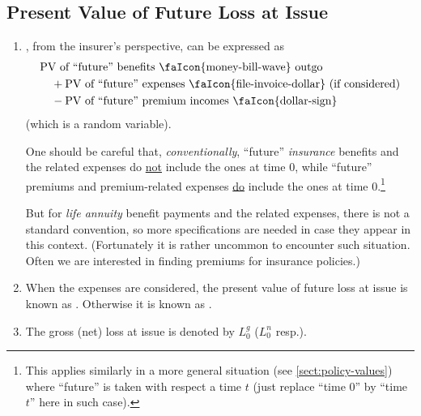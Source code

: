 \subsection{Present Value of Future Loss at Issue}
\begin{enumerate}
\item \label{it:pv-future-loss-at-issue}
, from the insurer's 
perspective, can be expressed as
\begin{align*}
&\text{PV of ``future'' benefits \faIcon{money-bill-wave} outgo} \\
&\quad+ \text{PV of ``future'' expenses \faIcon{file-invoice-dollar} (if considered)}\\
&\quad- \text{PV of ``future'' premium incomes \faIcon{dollar-sign}}
\end{align*}
(which is a random variable).

\begin{warning}
One should be careful that, \emph{conventionally}, ``future'' \emph{insurance}
benefits and the related expenses do \underline{not} include the ones at time
0, while ``future'' premiums and premium-related expenses \underline{do}
include the ones at time 0.\footnote{This applies similarly in a more general
situation (see \cref{sect:policy-values}) where ``future'' is taken with
respect a time \(t\) (just replace ``time 0'' by ``time \(t\)'' here in such
case).}

But for \emph{life annuity} benefit payments and the related expenses,
there is not a standard convention, so more specifications are needed in case
they appear in this context.  (Fortunately it is rather uncommon to encounter
such situation. Often we are interested in finding premiums for insurance
policies.)
\end{warning}

\item When the expenses  are considered, the
present value of future loss at issue is known as .
Otherwise it is known as .

\item The gross (net) loss at issue is denoted by \(L_0^g\)
(\(L_0^n\) resp.).



\end{enumerate}
